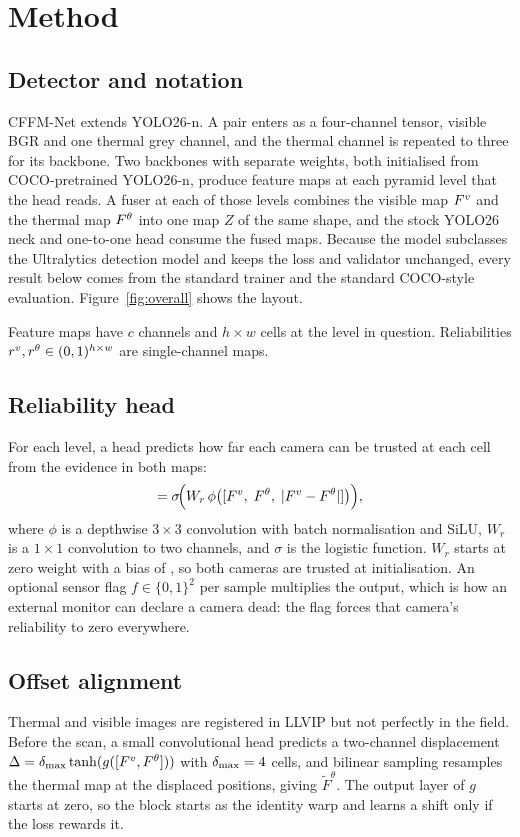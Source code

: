 \section{Method}
\label{sec:method}
\subsection{Detector and notation}
CFFM-Net extends YOLO26-n. A pair enters as a four-channel tensor, visible BGR and one thermal grey channel, and the thermal channel is repeated to three for its backbone. Two backbones with separate weights, both initialised from COCO-pretrained YOLO26-n, produce feature maps at each pyramid level that the head reads. A fuser at each of those levels combines the visible map $F^{v}$ and the thermal map $F^{\theta}$ into one map $Z$ of the same shape, and the stock YOLO26 neck and one-to-one head consume the fused maps. Because the model subclasses the Ultralytics detection model and keeps the loss and validator unchanged, every result below comes from the standard trainer and the standard COCO-style evaluation. Figure~\ref{fig:overall} shows the layout.

Feature maps have $c$ channels and $h\times w$ cells at the level in question. Reliabilities $r^{v},r^{\theta}\in(0,1)^{h\times w}$ are single-channel maps.

\subsection{Reliability head}
For each level, a head predicts how far each camera can be trusted at each cell from the evidence in both maps:
\begin{equation}
[\rv,\rt]=\sigma\!\Big(W_r\,\phi\big([\Fv,\;\Ft,\;|\Fv-\Ft|]\big)\Big),
\end{equation}
where $\phi$ is a depthwise $3{\times}3$ convolution with batch normalisation and SiLU, $W_r$ is a $1{\times}1$ convolution to two channels, and $\sigma$ is the logistic function. $W_r$ starts at zero weight with a bias of \cfgInitBias{}, so both cameras are trusted at initialisation. An optional sensor flag $f\in\{0,1\}^2$ per sample multiplies the output, which is how an external monitor can declare a camera dead: the flag forces that camera's reliability to zero everywhere.

\subsection{Offset alignment}
Thermal and visible images are registered in LLVIP but not perfectly in the field. Before the scan, a small convolutional head predicts a two-channel displacement $\Delta=\delta_{\max}\tanh(g([F^{v},F^{\theta}]))$ with $\delta_{\max}=4{}$ cells, and bilinear sampling resamples the thermal map at the displaced positions, giving $\tilde F^{\theta}$. The output layer of $g$ starts at zero, so the block starts as the identity warp and learns a shift only if the loss rewards it.


